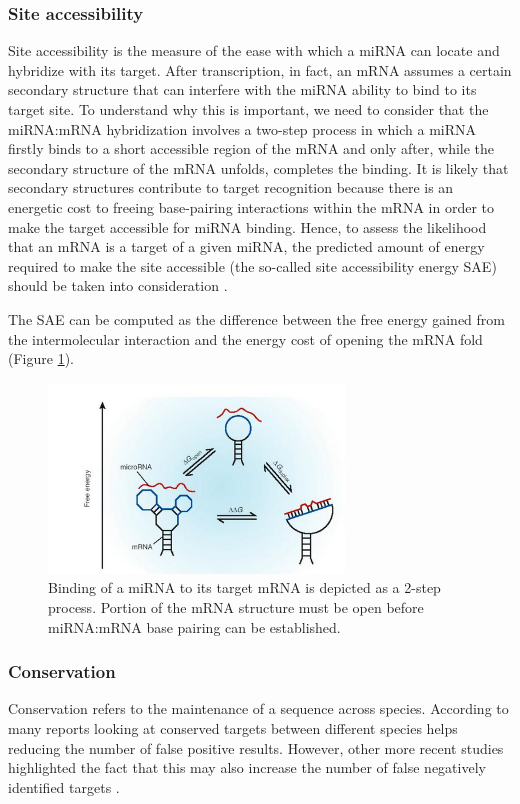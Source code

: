 \subsubsection{Site accessibility}
Site accessibility is the measure of the ease with which a miRNA can locate and hybridize with its target. After transcription, in fact,  an mRNA assumes a certain secondary structure that can interfere with the miRNA ability to bind to its target site. To understand why this is important, we need to consider that the miRNA:mRNA hybridization involves a two-step process in which a miRNA firstly binds to a short accessible region of the mRNA and only after, while the secondary structure of the mRNA unfolds, completes the binding.  It is likely that secondary structures contribute to target recognition because there is an energetic cost to freeing base-pairing interactions within the mRNA in order to make the target accessible for miRNA binding. Hence, to assess the likelihood that an mRNA is a target of a given miRNA, the predicted amount of energy required to make the site accessible (the so-called site accessibility energy SAE) should be taken into consideration \cite{accessibility_nrg_role}.

The SAE	can be computed as the difference between  the free energy gained from the intermolecular interaction and the energy cost of opening the mRNA fold (Figure \ref{fig:opening_energy}).

\begin{figure}[hbt!]
	\centering
	\includegraphics[width=0.7\textwidth]{Figures/opening_energy}
	\caption{ Binding of a miRNA to its target mRNA is depicted as a 2-step process. Portion of the mRNA structure must be open before miRNA:mRNA base pairing can be established.}
	\label{fig:opening_energy}
\end{figure}

\subsubsection{Conservation}
Conservation refers to the maintenance of a sequence across species. According to many reports \cite{computational_methods} looking at conserved targets between different species helps reducing the number of false positive results. However, other more recent studies highlighted the fact that this may also increase the number of false negatively identified targets \cite{conserved_pairing}.